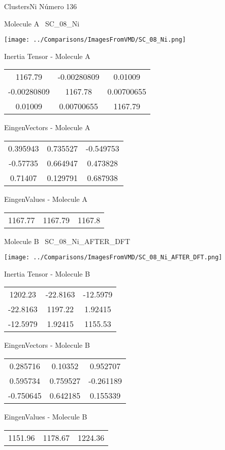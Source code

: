 \vtab[-3cm]
\begin{center}
{\large ClustersNi \tab Número 136}
\end{center}
\begin{multicols}{2}
\begin{center}

Molecule A \
SC\_08\_Ni

\texttt{[image: ../Comparisons/ImagesFromVMD/SC\_08\_Ni.png]}

Inertia Tensor - Molecule A \\
\begin{tabular}{|c c c|}
1167.79	 & 	-0.00280809	 & 	0.01009	 \\
-0.00280809	 & 	1167.78	 & 	0.00700655	 \\
0.01009	 & 	0.00700655	 & 	1167.79
\end{tabular}

\vtab
 EingenVectors - Molecule A     \\
\begin{tabular}{|c c c|}
0.395943	 & 	0.735527	 & 	-0.549753	 \\
-0.57735	 & 	0.664947	 & 	0.473828	 \\
0.71407	 & 	0.129791	 & 	0.687938
\end{tabular}

\vtab
 EingenValues - Molecule A     \\
\begin{tabular}{|c c c|}
1167.77	 & 	1167.79	 & 	1167.8	 \\
\end{tabular}
\columnbreak

Molecule B \
SC\_08\_Ni\_AFTER\_DFT

\texttt{[image: ../Comparisons/ImagesFromVMD/SC\_08\_Ni\_AFTER\_DFT.png]}

Inertia Tensor - Molecule B \\
\begin{tabular}{|c c c|}
1202.23	 & 	-22.8163	 & 	-12.5979	 \\
-22.8163	 & 	1197.22	 & 	1.92415	 \\
-12.5979	 & 	1.92415	 & 	1155.53
\end{tabular}

\vtab
 EingenVectors - Molecule B     \\
\begin{tabular}{|c c c|}
0.285716	 & 	0.10352	 & 	0.952707	 \\
0.595734	 & 	0.759527	 & 	-0.261189	 \\
-0.750645	 & 	0.642185	 & 	0.155339
\end{tabular}

\vtab
 EingenValues - Molecule B     \\
\begin{tabular}{|c c c|}
1151.96	 & 	1178.67	 & 	1224.36	 \\
\end{tabular}

\end{center}
\end{multicols}

